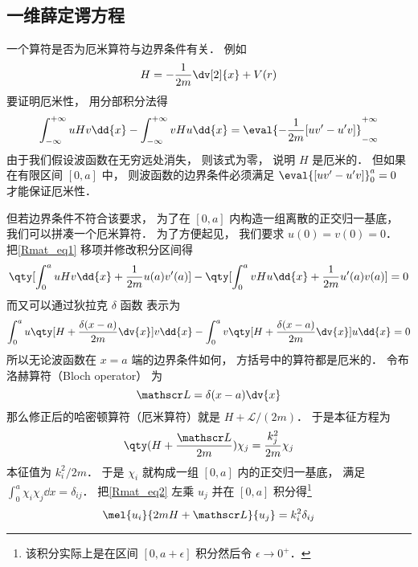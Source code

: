 
\subsection{一维薛定谔方程}
一个算符是否为厄米算符与边界条件有关． 例如
\begin{equation}
H = -\frac{1}{2m}\dv[2]{x} + V(r)
\end{equation}
要证明厄米性， 用分部积分法得
\begin{equation}\label{Rmat_eq1}
\int_{-\infty}^{+\infty} uHv\dd{x} - \int_{-\infty}^{+\infty} vHu\dd{x}
= \eval{-\frac{1}{2m}[uv' - u'v]}_{-\infty}^{+\infty}
\end{equation}
由于我们假设波函数在无穷远处消失， 则该式为零， 说明 $H$ 是厄米的． 但如果在有限区间 $[0, a]$ 中， 则波函数的边界条件必须满足 $\eval{[uv' - u'v]}_{0}^{a} = 0$ 才能保证厄米性．

但若边界条件不符合该要求， 为了在 $[0,a]$ 内构造一组离散的正交归一基底， 我们可以拼凑一个厄米算符． 为了方便起见， 我们要求 $u(0) = v(0) = 0$． 把\autoref{Rmat_eq1} 移项并修改积分区间得
\begin{equation}
\qty[\int_{0}^{a} uHv\dd{x} + \frac{1}{2m}u(a)v'(a)] - \qty[\int_{0}^{a} vHu\dd{x} + \frac{1}{2m}u'(a)v(a)]
= 0
\end{equation}
而又可以通过狄拉克 $\delta$ 函数 表示为
\begin{equation}
\int_{0}^{a} u\qty[H + \frac{\delta(x-a)}{2m}\dv{x}] v\dd{x} -
\int_{0}^{a} v\qty[H + \frac{\delta(x-a)}{2m}\dv{x}] u\dd{x} = 0
\end{equation}
所以无论波函数在 $x=a$ 端的边界条件如何， 方括号中的算符都是厄米的． 令布洛赫算符（Bloch operator） 为
\begin{equation}
\mathscr L = \delta(x-a)\dv{x}
\end{equation}
那么修正后的哈密顿算符（厄米算符）就是 $H + \mathscr L/(2m)$． 于是本征方程为
\begin{equation}\label{Rmat_eq2}
\qty(H + \frac{\mathscr L}{2m})\chi_j = \frac{k_j^2}{2m} \chi_j
\end{equation}
本征值为 ${k_i^2}/{2m}$． 于是 $\chi_i$ 就构成一组 $[0, a]$ 内的正交归一基底， 满足 $\int_0^a \chi_i \chi_j \dd{x} = \delta_{ij}$． 把\autoref{Rmat_eq2} 左乘 $u_j$ 并在 $[0,a]$ 积分得\footnote{该积分实际上是在区间 $[0,a+\epsilon]$ 积分然后令 $\epsilon\to 0^+$．}
\begin{equation}
\mel{u_i}{2mH + \mathscr L}{u_j} = k_i^2 \delta_{ij}
\end{equation}
